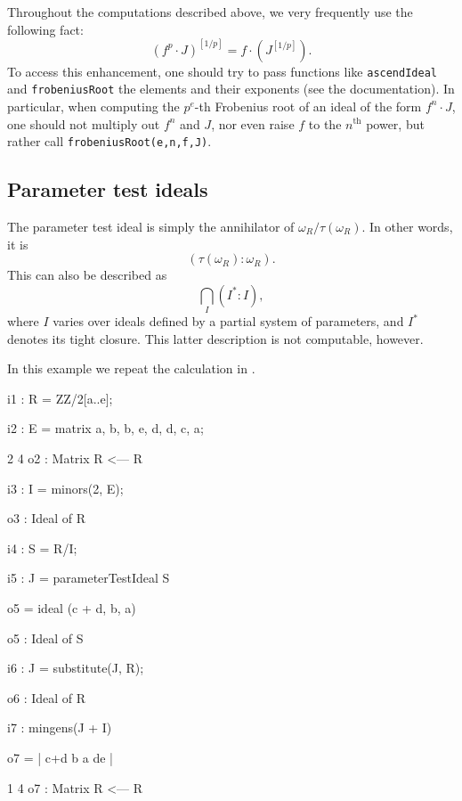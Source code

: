 \documentclass{amsart}
\begin{document}
\begin{remark}
Throughout the computations described above, we very frequently use the following fact:
\[
(f^p \cdot J)^{[1/p]} = f \cdot (J^{[1/p]}).
\]
To access this enhancement, one should try to pass functions like \texttt{ascendIdeal} and \texttt{frobeniusRoot} the elements and their exponents (see the documentation).
In particular, when computing the $p^e$-th Frobenius root of an ideal of the form $f^n \cdot J$, one should not multiply out $f^n$ and $J$, nor even raise $f$ to the $n^\mathrm{th}$ power, but rather call \texttt{frobeniusRoot(e,n,f,J)}.
\end{remark}

\subsection{Parameter test ideals}

The parameter test ideal is simply the annihilator of $\omega_R/\tau(\omega_R)$.  In other words, it is
\[
( \tau(\omega_R) : \omega_R ).
\]
This can also be described as
\[
\bigcap_{I} (I^* : I),
\]
where $I$ varies over ideals defined by a partial system of parameters, and $I^*$ denotes its tight closure.  This latter description is not computable, however.

\begin{example}\label{Example: parameter test ideal}
In this example we repeat the calculation in \cite[\S 9]{KatzmanParameterTestIdealOfCMRings}.

\medskip
{\small{}
\begin{MyVerbatim}
i1 : R = ZZ/2[a..e];

i2 : E = matrix {{a, b, b, e}, {d, d, c, a}};

             2       4
o2 : Matrix R  <--- R

i3 : I = minors(2, E);

o3 : Ideal of R

i4 : S = R/I;

i5 : J = parameterTestIdeal S

o5 = ideal (c + d, b, a)

o5 : Ideal of S

i6 : J = substitute(J, R);

o6 : Ideal of R

i7 : mingens(J + I)

o7 = | c+d b a de |

             1       4
o7 : Matrix R  <--- R
\end{MyVerbatim}
}\medskip

\end{example}
\end{document}

